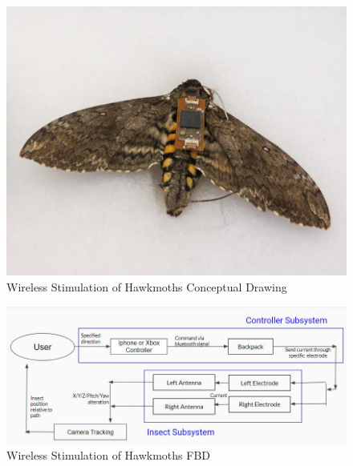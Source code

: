 \documentclass{article}
\begin{document}
\begin{figure}[ht!]
\centering
\includegraphics[scale=0.45]{moth.png}
\caption{Wireless Stimulation of Hawkmoths Conceptual Drawing}
\label{fig:concept1}
\end{figure}

\begin{figure}[ht!]
\centering
\includegraphics[scale=0.45]{fbd1.JPG}
\caption{Wireless Stimulation of Hawkmoths FBD}
\label{fig:FBD1}
\end{figure}
\end{document}

